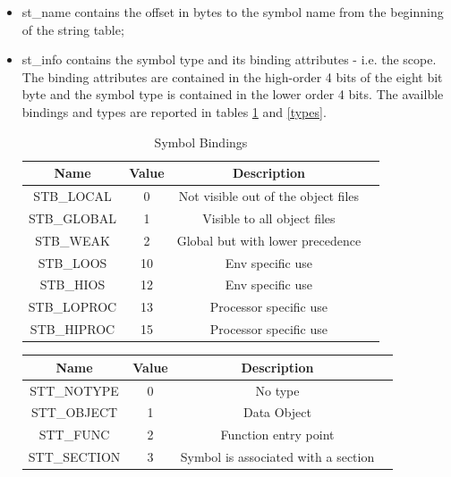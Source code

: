 \begin{itemize} 
\item {\ttfamily st\_name} contains the offset in
bytes to the symbol name from the beginning of the string table;
\item {\ttfamily st\_info} contains the symbol type and its binding attributes - i.e. the scope. The binding attributes are contained in the high-order 4 bits of the eight bit byte and the symbol type is contained in the lower order 4 bits. The availble bindings and types are reported in tables \ref{bindings} and \ref{types}. 
\begin{table}[!htbp]
 \begin{center}
     \begin{tabular}{|c|c|c|c|} 
         \hline \textbf{Name} & \textbf{Value} & \textbf{Description}\\
         \hline {\ttfamily STB\_LOCAL} & 0 & Not visible out of the object files\\
         \hline {\ttfamily STB\_GLOBAL} & 1 & Visible to all object files\\
         \hline {\ttfamily STB\_WEAK} & 2 & Global but with lower precedence\\
         \hline {\ttfamily STB\_LOOS} & 10 & Env specific use\\
         \hline {\ttfamily STB\_HIOS} & 12 & Env specific use\\
         \hline {\ttfamily STB\_LOPROC} & 13 & Processor specific use\\
         \hline {\ttfamily STB\_HIPROC} & 15 & Processor specific use\\
         \hline
     \end{tabular}
 \caption{Symbol Bindings}
 \label{bindings}
\end{center}
\end{table}
\begin{table}[!htbp]
\begin{center}
    \begin{tabular}{|c|c|c|c|}
        \hline \textbf{Name} & \textbf{Value} & \textbf{Description}\\
        \hline {\ttfamily STT\_NOTYPE} & 0 & No type\\
        \hline {\ttfamily STT\_OBJECT} & 1 & Data Object\\
        \hline {\ttfamily STT\_FUNC} & 2 & Function entry point\\
        \hline {\ttfamily STT\_SECTION} & 3 & Symbol is associated with a section\\

\end{tabular}
\end{center}
\end{table}
\end{itemize}
